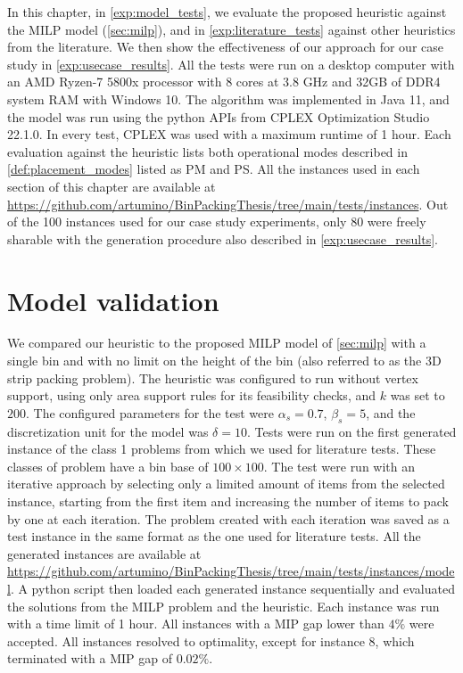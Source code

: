 In this chapter, in \cref{exp:model_tests}, we evaluate the proposed heuristic against the MILP model (\ref{sec:milp}), and in \cref{exp:literature_tests} against other heuristics from the literature. We then show the effectiveness of our approach for our case study in \cref{exp:usecase_results}.
All the tests were run on a desktop computer with an AMD Ryzen-7 5800x processor with 8 cores at 3.8 GHz and 32GB of DDR4 system RAM with Windows 10. The algorithm was implemented in Java 11, and the model was run using the python APIs from CPLEX Optimization Studio 22.1.0.
In every test, CPLEX was used with a maximum runtime of 1 hour.
Each evaluation against the heuristic lists both operational modes described in \cref{def:placement_modes} listed as PM and PS.
All the instances used in each section of this chapter are available at \url{https://github.com/artumino/BinPackingThesis/tree/main/tests/instances}.
Out of the 100 instances used for our case study experiments, only 80 were freely sharable with the generation procedure also described in \cref{exp:usecase_results}.

\section{Model validation}
We compared our heuristic to the proposed MILP model of \cref{sec:milp} with a single bin and with no limit on the height of the bin (also referred to as the 3D strip packing problem).
The heuristic was configured to run without vertex support, using only area support rules for its feasibility checks, and $k$ was set to $200$.
The configured parameters for the test were $\alpha_s = 0.7$, $\beta_s = 5$, and the discretization unit for the model was $\delta = 10$.
Tests were run on the first generated instance of the class 1 problems from \citep{martello2000three} which we used for literature tests. These classes of problem have a bin base of $100 \times 100$.
The test were run with an iterative approach by selecting only a limited amount of items from the selected instance, starting from the first item and increasing the number of items to pack by one at each iteration.
The problem created with each iteration was saved as a test instance in the same format as the one used for literature tests.
All the generated instances are available at \url{https://github.com/artumino/BinPackingThesis/tree/main/tests/instances/model}.
A python script then loaded each generated instance sequentially and evaluated the solutions from the MILP problem and the heuristic.
Each instance was run with a time limit of 1 hour. All instances with a MIP gap lower than $4\%$ were accepted.
All instances resolved to optimality, except for instance 8, which terminated with a MIP gap of $0.02\%$.

